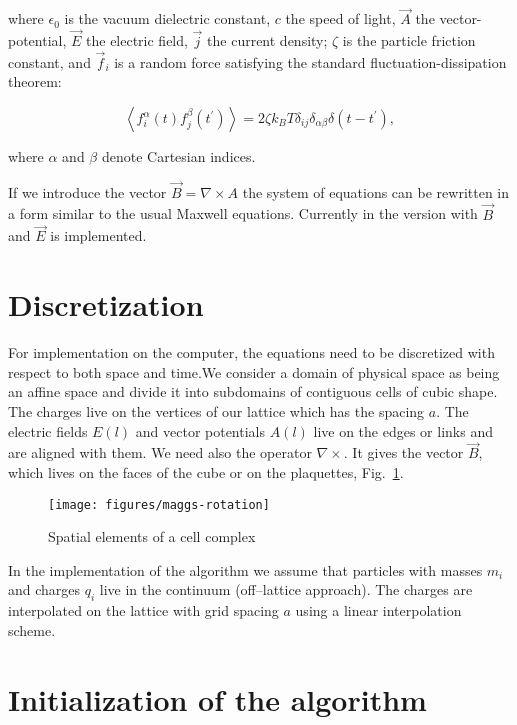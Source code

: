 where $\epsilon_0$ is the vacuum dielectric constant, $c$ the speed of
light, $\vec A$ the vector-potential, $\vec E$ the electric field,
$\vec j$ the current density; $\zeta$ is the particle friction
constant, and $\vec f_i$ is a random force satisfying the standard
fluctuation-dissipation theorem:

\begin{equation}
\left< f_i^\alpha (t) f_j^\beta (t^\prime) \right> =
2 \zeta k_B T \delta_{ij} \delta_{\alpha \beta}
\delta (t - t^\prime),
\end{equation}

where $\alpha$ and $\beta$ denote Cartesian indices.

If we introduce the vector $\vec B=\nabla\times A$ the system of
equations can be rewritten in a form similar to the usual Maxwell
equations. Currently in {\es} the version with $\vec B$ and $\vec E$
is implemented.

\section{Discretization}

For implementation on the computer, the equations need to be
discretized with respect to both space and time.We consider a domain
of physical space as being an affine space and divide it into
subdomains of contiguous cells of cubic shape. The charges live on the
vertices of our lattice which has the spacing $a$. The electric fields
$E(l)$ and vector potentials $A(l)$ live on the edges or links and are
aligned with them. We need also the operator $\nabla\times{}$. It
gives the vector $\vec B$, which lives on the faces of the cube or on
the plaquettes, Fig.~\ref{fig:cellstructure}.

\begin{figure}[ht]
  \centering
  \texttt{[image: figures/maggs-rotation]}
  \caption{Spatial elements of a cell complex}
  \label{fig:cellstructure}  
\end{figure}

In the implementation of the algorithm we assume that particles with
masses $m_i$ and charges $q_i$ live in the continuum (off--lattice
approach). The charges are interpolated on the lattice with grid
spacing $a$ using a linear interpolation scheme.

\section{Initialization of the algorithm}

